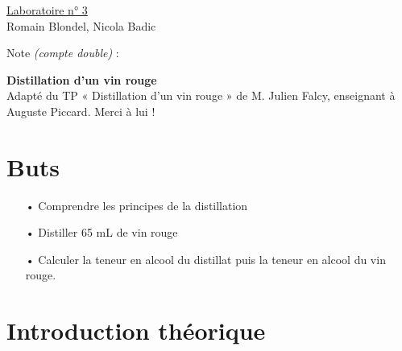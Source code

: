 \documentclass[11pt]{article}
\begin{document}
\huge
\begin{minipage}{.5\textwidth}%
\begin{flushleft}
\underline{Laboratoire n° 3} \\
\normalsize Romain Blondel, Nicola Badic
\end{flushleft}
\end{minipage}
\begin{minipage}{.5\textwidth}%
\begin{flushright}
\huge
Note \normalsize\textit{(compte double)} \huge :\hrulefill
\end{flushright}
\end{minipage}
\begin{center}
\textbf{Distillation d’un vin rouge} \\
\scriptsize Adapté du TP « Distillation d’un vin rouge » de M. Julien Falcy, enseignant à Auguste Piccard. Merci à lui ! 
\end{center}
\normalsize
\section*{Buts}
\begin{itemize}
\item[•]Comprendre les principes de la distillation
\item[•]Distiller 65 mL de vin rouge 
\item[•]Calculer la teneur en alcool du distillat puis la teneur en alcool du vin rouge.
\end{itemize}
\section*{Introduction théorique}
\end{document}
